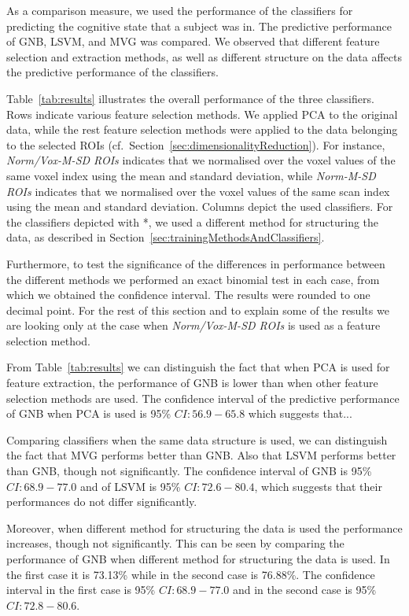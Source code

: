 \documentclass[preprint,journal,11pt]{vgtc}
\begin{document}
As a comparison measure, we used the performance of the classifiers for predicting the cognitive state that a subject was in. The predictive performance of GNB, LSVM, and MVG was compared. We observed that different feature selection and extraction methods, as well as different structure on the data affects the predictive performance of the classifiers.

Table~\ref{tab:results} illustrates the overall performance of the three classifiers. Rows indicate various feature selection methods. We applied PCA to the original data, while the rest feature selection methods were applied to the data belonging to the selected ROIs (cf.~Section~\ref{sec:dimensionalityReduction}). For instance, \emph{Norm/Vox-M-SD ROIs} indicates that we normalised over the voxel values of the same voxel index using the mean and standard deviation, while \emph{Norm-M-SD ROIs} indicates that we normalised over the voxel values of the same scan index using the mean and standard deviation. Columns depict the used classifiers. For the classifiers depicted with *, we used a different method for structuring the data, as described in Section~\ref{sec:trainingMethodsAndClassifiers}.

Furthermore, to test the significance of the differences in performance between the different methods we performed an exact binomial test in each case, from which we obtained the confidence interval. The results were rounded to one decimal point. For the rest of this section and to explain some of the results we are looking only at the case when \emph{Norm/Vox-M-SD ROIs} is used as a feature selection method.

From Table~\ref{tab:results} we can distinguish the fact that when PCA is used for feature extraction, the performance of GNB is lower than when other feature selection methods are used. The confidence interval of the predictive performance of GNB when PCA is used is 95\% $CI: 56.9 - 65.8$ which suggests that...

Comparing classifiers when the same data structure is used, we can distinguish the fact that MVG performs better than GNB. Also that LSVM performs better than GNB, though not significantly. The confidence interval of GNB is 95\% $CI: 68.9-77.0$ and of LSVM is 95\% $CI: 72.6-80.4$, which suggests that their performances do not differ significantly.

Moreover, when different method for structuring the data is used the performance increases, though not significantly. This can be seen by comparing the performance of GNB when different method for structuring the data is used. In the first case it is 73.13\% while in the second case is 76.88\%. The confidence interval in the first case is 95\% $CI: 68.9 - 77.0$ and in the second case is 95\% $CI: 72.8 - 80.6$.
\end{document}
